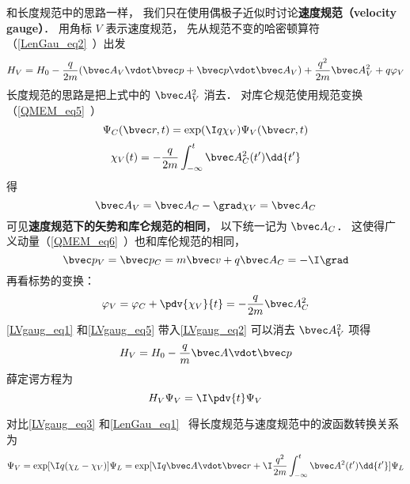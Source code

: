 

和长度规范中的思路一样， 我们只在使用偶极子近似时讨论\textbf{速度规范（velocity gauge）}． 用角标 $V$ 表示速度规范， 先从规范不变的哈密顿算符（\autoref{LenGau_eq2}~）出发
\begin{equation}\label{LVgaug_eq2}
H_V = H_0 - \frac{q}{2m} (\bvec A_V \vdot \bvec p + \bvec p \vdot \bvec A_V)
+ \frac{q^2}{2m} \bvec A_V^2 + q \varphi_V
\end{equation}
长度规范的思路是把上式中的 $\bvec A_V^2$ 消去． 对库仑规范使用规范变换（\autoref{QMEM_eq5}~）
\begin{equation}\label{LVgaug_eq3}
\Psi_C(\bvec r, t) = \exp(\I q\chi_V)\Psi_V(\bvec r, t)
\end{equation}
\begin{equation}\label{LVgaug_eq4}
\chi_V(t) = -\frac{q}{2m} \int_{-\infty}^t \bvec A_C^2(t') \dd{t'}
\end{equation}
得
\begin{equation}\label{LVgaug_eq1}
\bvec A_V = \bvec A_C - \grad \chi_V = \bvec A_C
\end{equation}
可见\textbf{速度规范下的矢势和库仑规范的相同}， 以下统一记为 $\bvec A_C$． 这使得广义动量（\autoref{QMEM_eq6}~）也和库伦规范的相同， 
\begin{equation}
\bvec p_V = \bvec p_C =  m \bvec v + q\bvec A_{C} = -\I \grad
\end{equation}
再看标势的变换：
\begin{equation}\label{LVgaug_eq5}
\varphi_V = \varphi_C + \pdv{\chi_V}{t} = - \frac{q}{2m} \bvec A_C^2
\end{equation}
\autoref{LVgaug_eq1} 和\autoref{LVgaug_eq5} 带入\autoref{LVgaug_eq2} 可以消去 $\bvec A_V^2$ 项得
\begin{equation}
H_V = H_0 - \frac{q}{m} \bvec A \vdot \bvec p
\end{equation}
薛定谔方程为
\begin{equation}
H_V \Psi_V = \I \pdv{t} \Psi_V
\end{equation}


对比\autoref{LVgaug_eq3} 和\autoref{LenGau_eq1}~ 得长度规范与速度规范中的波函数转换关系为
\begin{equation}
\Psi_V = \exp[\I q(\chi_L - \chi_V)]\Psi_L = \exp[\I q \bvec A\vdot \bvec r + \I\frac{q^2}{2m}\int_{-\infty}^t \bvec A^2(t')\dd{t'}] \Psi_L
\end{equation}
